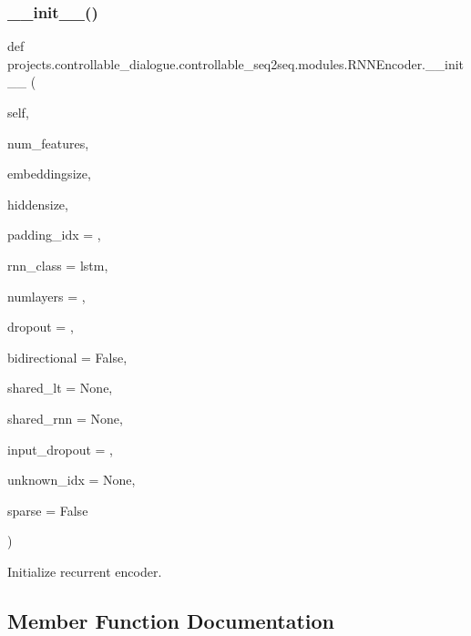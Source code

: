 \subsubsection{\texorpdfstring{\+\_\+\+\_\+init\+\_\+\+\_\+()}{\_\_init\_\_()}}
{\footnotesize\ttfamily def projects.\+controllable\+\_\+dialogue.\+controllable\+\_\+seq2seq.\+modules.\+R\+N\+N\+Encoder.\+\_\+\+\_\+init\+\_\+\+\_\+ (\begin{DoxyParamCaption}\item[{}]{self,  }\item[{}]{num\+\_\+features,  }\item[{}]{embeddingsize,  }\item[{}]{hiddensize,  }\item[{}]{padding\+\_\+idx = {},  }\item[{}]{rnn\+\_\+class = {\ttfamily \textquotesingle{}lstm\textquotesingle{}},  }\item[{}]{numlayers = {},  }\item[{}]{dropout = {},  }\item[{}]{bidirectional = {\ttfamily False},  }\item[{}]{shared\+\_\+lt = {\ttfamily None},  }\item[{}]{shared\+\_\+rnn = {\ttfamily None},  }\item[{}]{input\+\_\+dropout = {},  }\item[{}]{unknown\+\_\+idx = {\ttfamily None},  }\item[{}]{sparse = {\ttfamily False} }\end{DoxyParamCaption})}

\begin{DoxyVerb}Initialize recurrent encoder.
\end{DoxyVerb}
 

\subsection{Member Function Documentation}
\mbox{\label{classprojects_1_1controllable__dialogue_1_1controllable__seq2seq_1_1modules_1_1RNNEncoder_aff331ac57c336c48e5853f16edacb6db}} 
